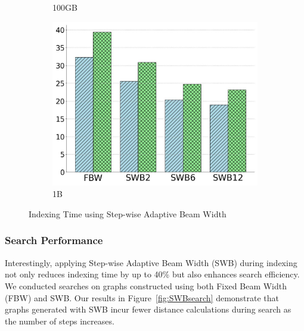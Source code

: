 \begin{figure}[htbp]
\begin{subfigure}{0.31\textwidth}
        \caption{100GB}
        \label{fig:SWB:100GB_Time}
    \end{subfigure}    
         \begin{subfigure}{0.31\textwidth}
             \captionsetup{justification=centering}
	\centering	
        \includegraphics[width=\textwidth]{../img/oigas/SWB/1B_Idx.jpg}
        \caption{1B}
        \label{fig:SWB:1B_Time}
    \end{subfigure}
            \caption{Indexing Time using Step-wise Adaptive Beam Width}
            \label{fig:oigas:swb:idx}
    \end{figure}


\subsubsection{Search Performance}

Interestingly, applying Step-wise Adaptive Beam Width (SWB) during indexing not only reduces indexing time by up to 40\% but also enhances search efficiency. We conducted searches on graphs constructed using both Fixed Beam Width (FBW) and SWB. Our results in Figure~\ref{fig:SWBsearch} demonstrate that graphs generated with SWB incur fewer distance calculations during search as the number of steps increases.


